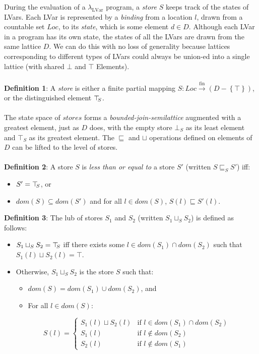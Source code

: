 \documentclass[twocolumn]{article}
\newcommand{\lambdaLVar}{\ensuremath{\lambda_{\textrm{LVar}}}}
\newcommand{\userleq}{\ensuremath{\sqsubseteq}}
\newcommand{\Loc}{\mathit{Loc}}
\newcommand{\fmap}{\ensuremath{\stackrel{\textrm{fin}}{\rightarrow}}}
\newcommand{\setof}[1]{\left\{#1\right\}}
\newcommand{\topS}{\ensuremath{\top\hspace{-0.85mm}_{S}}}
\newcommand{\leqstore}[2]{\ensuremath{#1 \userleq_S #2}}
\newcommand{\dom}[1]{\ensuremath{\mathit{dom}(#1)}}
\newcommand{\userlub}[2]{\ensuremath{#1 \sqcup #2}}
\newcommand{\lubstore}[2]{\ensuremath{#1 \sqcup_{S} #2}}
\begin{document}
During the evaluation of a $\lambdaLVar$ program, a \emph{store} $S$ keeps track of the states of LVars. Each LVar is represented by a \emph{binding} from a location \emph{$l$}, drawn from a countable set $\Loc$, to its \emph{state}, which is some element $d \in D$. Although each LVar in a program has its own state, the states of all the LVars are drawn from the same lattice $D$. We can do this with no loss of generality because lattices corresponding to different types of LVars could always be union-ed into a single lattice (with shared $\bot$ and $\top$ Elements). \\ \\
\textbf{Definition 1}: A \emph{store} is either a finite partial mapping $S : \Loc \fmap (D - \setof{\top})$, or the distinguished element $\topS$. \\ \\
The state space of $stores$ forms a \emph{bounded-join-semilattice} augmented with a greatest element, just as $D$ does, with the empty store $\bot_S$ as its least element and $\top_S$ as its greatest element. The $\userleq$ and $\sqcup$ operations defined on elements of $D$ can be lifted to the level of stores.\\ \\
\textbf{Definition 2}: 
 A store $S$ is \emph{less than or equal to} a store $S'$ (written
$\leqstore{S}{S'}$) iff:
\begin{itemize}
\item $S' = \topS$, or
\item $\dom{S} \subseteq \dom{S'}$ and for all $l
\in \dom{S}$, $S(l) \userleq S'(l)$.
\end{itemize}
\textbf{Definition 3}:  The lub of stores $S_1$ and $S_2$ (written $\lubstore{S_1}{S_2}$) is
defined as follows:
\begin{itemize}
\item $\lubstore{S_1}{S_2} = \topS$ iff there exists some $l \in
\dom{S_1} \cap \dom{S_2}$ such that $\userlub{S_1(l)}{S_2(l)} = \top$.
\item Otherwise, $\lubstore{S_1}{S_2}$ is the store $S$ such that:
\begin{itemize}
\item $\dom{S} = \dom{S_1} \cup \dom{S_2}$, and
\item For all $l \in \dom{S}$:
\end{itemize}
\begin{displaymath}
S(l) = \left\{ \begin{array}{ll}
\userlub{S_1(l)}{S_2(l)} & \textrm{if $l \in \dom{S_1} \cap \dom{S_2}$} \\
S_1(l) & \textrm{if $l \notin \dom{S_2}$} \\
S_2(l) & \textrm{if $l \notin \dom{S_1}$}
\end{array} \right.
\end{displaymath}
\end{itemize}
\end{document}
